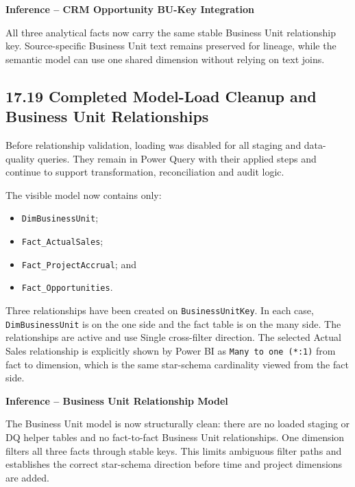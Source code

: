 \documentclass[11pt,a4paper]{article}
\begin{document}
\begin{inferencebox}

\textbf{Inference -- CRM Opportunity BU-Key Integration}

All three analytical facts now carry the same stable Business Unit relationship
key. Source-specific Business Unit text remains preserved for lineage, while
the semantic model can use one shared dimension without relying on text joins.

\end{inferencebox}

\subsection{17.19 Completed Model-Load Cleanup and Business Unit Relationships}

Before relationship validation, loading was disabled for all staging and
data-quality queries. They remain in Power Query with their applied steps and
continue to support transformation, reconciliation and audit logic.

The visible model now contains only:

\begin{itemize}[leftmargin=7mm,itemsep=2pt]
    \item \texttt{DimBusinessUnit};
    \item \texttt{Fact\_ActualSales};
    \item \texttt{Fact\_ProjectAccrual}; and
    \item \texttt{Fact\_Opportunities}.
\end{itemize}

Three relationships have been created on \texttt{BusinessUnitKey}. In each
case, \texttt{DimBusinessUnit} is on the one side and the fact table is on the
many side. The relationships are active and use Single cross-filter direction.
The selected Actual Sales relationship is explicitly shown by Power BI as
\texttt{Many to one (*:1)} from fact to dimension, which is the same star-schema
cardinality viewed from the fact side.

\begin{inferencebox}

\textbf{Inference -- Business Unit Relationship Model}

The Business Unit model is now structurally clean: there are no loaded staging
or DQ helper tables and no fact-to-fact Business Unit relationships. One
dimension filters all three facts through stable keys. This limits ambiguous
filter paths and establishes the correct star-schema direction before time and
project dimensions are added.

\end{inferencebox}
\end{document}
